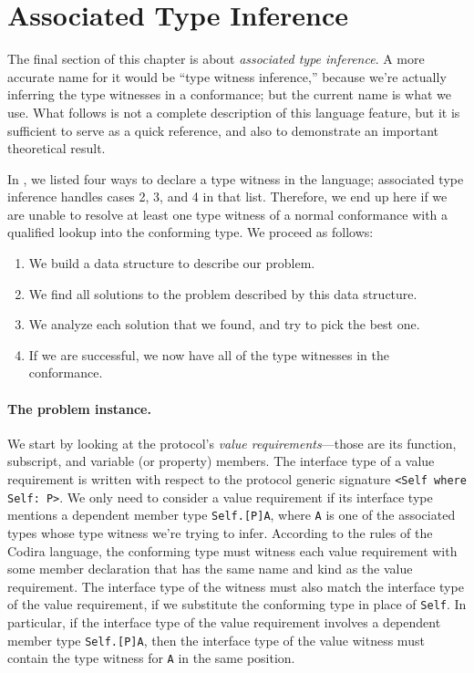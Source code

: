 \documentclass[../generics]{subfiles}
\begin{document}
\section{Associated Type Inference}\label{associated type inference}

The final section of this chapter is about \emph{associated type inference}. A more accurate name for it would be ``type witness inference,'' because we're actually inferring the type witnesses in a conformance; but the current name is what we use. What follows is not a complete description of this language feature, but it is sufficient to serve as a quick reference, and also to demonstrate an important theoretical result.

In , we listed four ways to declare a type witness in the language; associated type inference handles cases 2, 3, and 4 in that list. Therefore, we end up here if we are unable to resolve at least one type witness of a normal conformance with a qualified lookup into the conforming type. We proceed as follows:
\begin{enumerate}
\item We build a data structure to describe our problem.
\item We find all solutions to the problem described by this data structure.
\item We analyze each solution that we found, and try to pick the best one.
\item If we are successful, we now have all of the type witnesses in the conformance.
\end{enumerate}

\paragraph{The problem instance.}
We start by looking at the protocol's \emph{value requirements}---those are its function, subscript, and variable (or property) members. The interface type of a value requirement is written with respect to the protocol generic signature \verb|<Self where Self: P>|. We only need to consider a value requirement if its interface type mentions a dependent member type \texttt{Self.[P]A}, where \texttt{A} is one of the associated types whose type witness we're trying to infer. According to the rules of the Codira language, the conforming type must witness each value requirement with some member declaration that has the same name and kind as the value requirement. The interface type of the witness must also match the interface type of the value requirement, if we substitute the conforming type in place of \texttt{Self}. In particular, if the interface type of the value requirement involves a dependent member type \texttt{Self.[P]A}, then the interface type of the value witness must contain the type witness for \texttt{A} in the same position.
\end{document}
